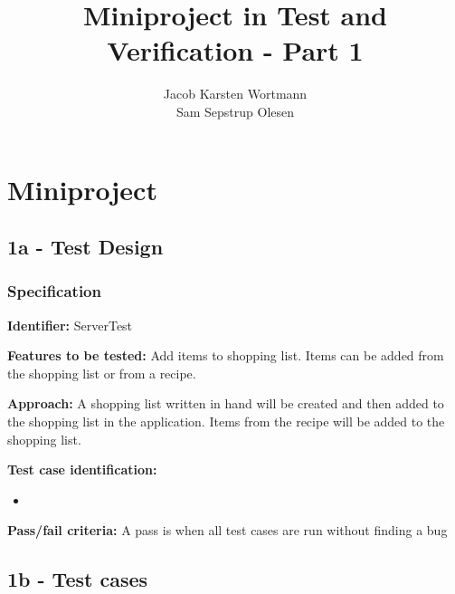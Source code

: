 \documentclass[a4paper,12pt]{memoir}
\title{Miniproject in Test and Verification - Part 1}
\author{Jacob Karsten Wortmann\\Sam Sepstrup Olesen}
\newcommand{\testdesign}[5]
{
\begin{framed}
\begin{description}
\item \textbf{Identifier:} #1
\item \textbf{Features to be tested:} #2
\item \textbf{Approach:} #3
\item \textbf{Test case identification:} #4
\item \textbf{Pass/fail criteria:} #5
\end{description}
\end{framed}
}
\begin{document}
\maketitle
\chapter*{Miniproject}
\section*{1a - Test Design}
\subsection*{Specification}
\testdesign
{ServerTest}
{Add items to shopping list. Items can be added from the shopping list or from a recipe.}
{A shopping list written in hand will be created and then added to the shopping list in the application. Items from the recipe will be added to the shopping list.}
{\begin{itemize}[nolistsep]
\item 
\end{itemize}}
{A pass is when all test cases are run without finding a bug}

\section*{1b - Test cases}
\end{document}
